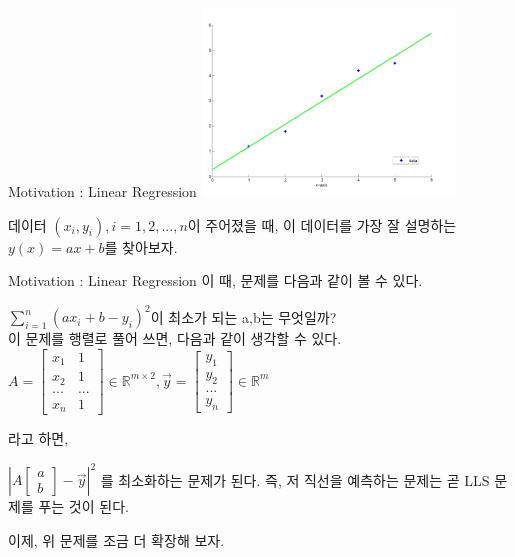 \documentclass{beamer}
\begin{document}
\begin{frame}{Motivation : Linear Regression} 
\includegraphics[height=5cm,keepaspectratio]{lin}

데이터 $(x_i, y_i), i=1,2,...,n$이 주어졌을 때, 이 데이터를 가장 잘 설명하는 $y(x) = ax + b$를 찾아보자. 
\end{frame}

\begin{frame}[allowframebreaks]{Motivation : Linear Regression} 
이 때, 문제를 다음과 같이 볼 수 있다. \\  
\vspace{5mm}

$\sum^n_{i=1} (ax_i + b - y_i)^2 $이 최소가 되는 a,b는 무엇일까? \\ 

\vspace{5mm}
이 문제를 행렬로 풀어 쓰면, 다음과 같이 생각할 수 있다. 
\framebreak
$ A = \left[ \begin{matrix} 
x_1 & 1 \\
x_2 & 1 \\ 
... & ... \\
x_n & 1 \end{matrix} \right] \in \mathds{R}^{m \times 2}, 
\vec{y} = \left[ \begin{matrix} 
y_1 \\ 
y_2 \\ 
... \\ 
y_n \end{matrix} \right] \in \mathds{R}^{m} $

라고 하면, 

$\left|A \left[ \begin{matrix} a \\ b \end{matrix} \right]  - \vec{y}\right|^2$ 를 최소화하는 문제가 된다. 즉, 저 직선을 예측하는 문제는 곧 LLS 문제를 푸는 것이 된다. 

이제, 위 문제를 조금 더 확장해 보자. 
\end{frame}
\end{document}
